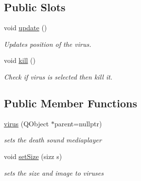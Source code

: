 \subsection*{Public Slots}
\begin{DoxyCompactItemize}
\item 
void \hyperlink{classvirus_a8b036fc788433ad3a705e9de6de41ee2}{update} ()
\begin{DoxyCompactList}\small\item\em Updates position of the virus. \end{DoxyCompactList}\item 
void \hyperlink{classvirus_a456b60cbaeed1b370a7f668111e34401}{kill} ()
\begin{DoxyCompactList}\small\item\em Check if virus is selected then kill it. \end{DoxyCompactList}\end{DoxyCompactItemize}
\subsection*{Public Member Functions}
\begin{DoxyCompactItemize}
\item 
\hyperlink{classvirus_aec80936bff04cb885c64075219835d45}{virus} (Q\+Object $\ast$parent=nullptr)
\begin{DoxyCompactList}\small\item\em sets the death sound mediaplayer \end{DoxyCompactList}\item 
void \hyperlink{classvirus_a7e52ed4f11deb1997a7fdbc07c7b038a}{set\+Size} (sizz s)
\begin{DoxyCompactList}\small\item\em sets the size and image to viruses \end{DoxyCompactList}\end{DoxyCompactItemize}

